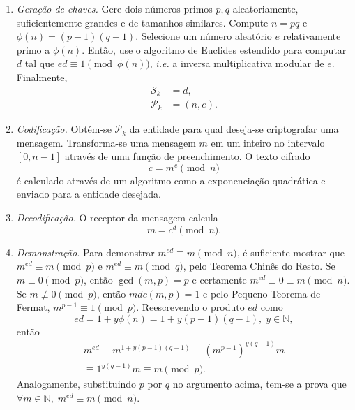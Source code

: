 \documentclass{ufsctex/ufsctex}
\newcommand{\pk}{\mathcal{P}_k}
\begin{document}
\begin{enumerate}

  \item[] \emph{Geração de chaves.} Gere dois números primos $p, q$
      aleatoriamente, suficientemente grandes e de tamanhos similares. Compute
        $n = p q$ e $\phi(n) = (p - 1) (q - 1)$. Selecione um número aleatório
        $e$ relativamente primo a $\phi(n)$. Então, use o algoritmo de Euclides
        estendido para computar $d$ tal que $ed \equiv 1 \pmod{\phi(n)}$,
        \emph{i.e.} a inversa multiplicativa modular de $e$. Finalmente,
        \begin{equation}
          \begin{align}
            \mathcal{S}_k &= d, \\
            \mathcal{P}_k &= (n, e).
          \end{align}
        \end{equation}

  \item[] \emph{Codificação.} Obtém-se $\pk{}$ da entidade para qual deseja-se
      criptografar uma mensagem. Transforma-se uma mensagem $m$ em um inteiro
        no intervalo $[0, n - 1]$ através de uma função de preenchimento.  O
        texto cifrado
        \begin{equation}
          c = m^e \pmod{n}
        \end{equation}
        é calculado através de um algoritmo como a exponenciação quadrática
        e enviado para a entidade desejada.

  \item[] \emph{Decodificação.} O receptor da mensagem calcula
      \begin{equation}
        m = c^d \pmod{n}.
      \end{equation}

  \item[] \emph{Demonstração.} Para demonstrar $m^{ed} \equiv m \pmod{n}$, é
      suficiente mostrar que $m^{ed} \equiv m \pmod{p}$ e $m^{ed} \equiv m
        \pmod{q}$, pelo Teorema Chinês do Resto. Se $m \equiv 0 \pmod{p}$,
        então $\gcd(m, p) = p$ e certamente $m^{ed} \equiv 0 \equiv m
        \pmod{n}$.  Se $m \not\equiv 0 \pmod{p}$, então $mdc(m, p) = 1$ e pelo
        Pequeno Teorema de Fermat, $m^{p - 1} \equiv 1 \pmod{p}$. Reescrevendo
        o produto $ed$ como
        \begin{equation}
          ed = 1 + y\phi(n) = 1 + y(p - 1)(q - 1), \; y \in \mathbb{N},
        \end{equation}
        então
        \begin{multline}
          m^{ed} \equiv m^{1 + y(p-1)(q-1)} \equiv {(m^{p-1})}^{y(q-1)}m \\
            \equiv 1^{y(q-1)}m \equiv m \pmod{p}.
        \end{multline}
        Analogamente, substituindo $p$ por $q$ no argumento acima, tem-se a
        prova que $\forall m \in \mathbb{N}, \; m^{ed} \equiv m \pmod{n}$.

\end{enumerate}
\end{document}
